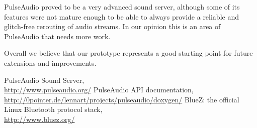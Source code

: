 \documentclass[conference]{IEEEtran}
\begin{document}
PulseAudio proved to be a very advanced sound server, although some of its features were not mature enough to be able to always provide a reliable and glitch-free rerouting of audio streams. In our opinion this is an area of PulseAudio that needs more work.

Overall we believe that our prototype represents a good starting point for future extensions and improvements.


\begin{thebibliography}{1}
	PulseAudio Sound Server,\\
	\url{http://www.pulseaudio.org/}
	PulseAudio API documentation,\\
	\url{http://0pointer.de/lennart/projects/pulseaudio/doxygen/}
	BlueZ: the official Linux Bluetooth protocol stack,\\
	\url{http://www.bluez.org/}
\end{thebibliography}
\end{document}
